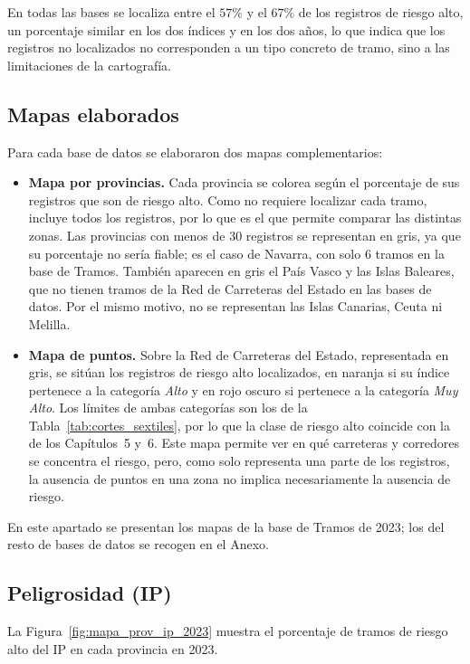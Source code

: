 \documentclass[twoside,a4paper,12pt,onecolumn,openany]{book}
\begin{document}
En todas las bases se localiza entre el $57\%$ y el $67\%$ de los registros de riesgo alto, un porcentaje similar en los dos índices y en los dos años, lo que indica que los registros no localizados no corresponden a un tipo concreto de tramo, sino a las limitaciones de la cartografía.
 
\subsection{Mapas elaborados}
 
Para cada base de datos se elaboraron dos mapas complementarios:
 
\begin{itemize}
    \item \textbf{Mapa por provincias.} Cada provincia se colorea según el porcentaje de sus registros que son de riesgo alto. Como no requiere localizar cada tramo, incluye todos los registros, por lo que es el que permite comparar las distintas zonas. Las provincias con menos de 30 registros se representan en gris, ya que su porcentaje no sería fiable; es el caso de Navarra, con solo 6 tramos en la base de Tramos. También aparecen en gris el País Vasco y las Islas Baleares, que no tienen tramos de la Red de Carreteras del Estado en las bases de datos. Por el mismo motivo, no se representan las Islas Canarias, Ceuta ni Melilla.
    \item \textbf{Mapa de puntos.} Sobre la Red de Carreteras del Estado, representada en gris, se sitúan los registros de riesgo alto localizados, en naranja si su índice pertenece a la categoría \textit{Alto} y en rojo oscuro si pertenece a la categoría \textit{Muy Alto}. Los límites de ambas categorías son los de la Tabla~\ref{tab:cortes_sextiles}, por lo que la clase de riesgo alto coincide con la de los Capítulos~5 y~6. Este mapa permite ver en qué carreteras y corredores se concentra el riesgo, pero, como solo representa una parte de los registros, la ausencia de puntos en una zona no implica necesariamente la ausencia de riesgo.
\end{itemize}
 
En este apartado se presentan los mapas de la base de Tramos de 2023; los del resto de bases de datos se recogen en el Anexo.
 
\subsection{Peligrosidad (IP)}
 
La Figura~\ref{fig:mapa_prov_ip_2023} muestra el porcentaje de tramos de riesgo alto del IP en cada provincia en 2023.
 
\end{document}
